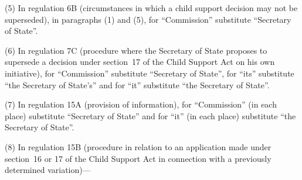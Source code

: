 \documentclass[12pt,a4paper]{article}
\begin{document}
(5) In regulation 6B (circumstances in which a child support decision may not be superseded), in paragraphs (1) and (5), for “Commission” substitute “Secretary of State”.

(6) In regulation 7C (procedure where the Secretary of State proposes to supersede a decision under section~17 of the Child Support Act on his own initiative), for “Commission” substitute “Secretary of State”, for “its” substitute “the Secretary of State’s” and for “it” substitute “the Secretary of State”.

(7) In regulation 15A (provision of information), for “Commission” (in each place) substitute “Secretary of State” and for “it” (in each place) substitute “the Secretary of State”.

(8) In regulation 15B (procedure in relation to an application made under section~16 or 17 of the Child Support Act in connection with a previously determined variation)—
\end{document}
